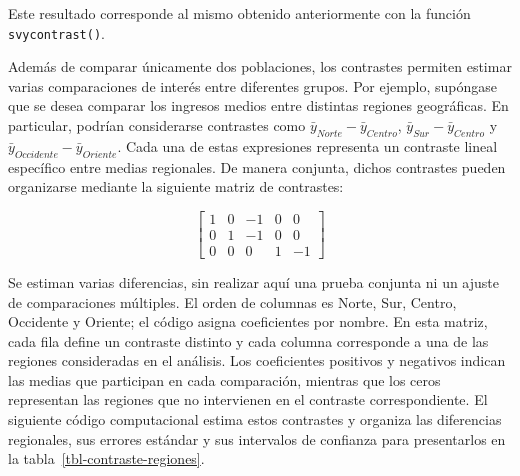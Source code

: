 \documentclass[
  spanish,
  11pt,
  letterpaper,
  oneside,
  open=any]{scrbook}
\begin{document}
Este resultado corresponde al mismo obtenido anteriormente con la
función \texttt{svycontrast()}.

Además de comparar únicamente dos poblaciones, los contrastes permiten
estimar varias comparaciones de interés entre diferentes grupos. Por
ejemplo, supóngase que se desea comparar los ingresos medios entre
distintas regiones geográficas. En particular, podrían considerarse
contrastes como \(\bar{y}_{Norte} - \bar{y}_{Centro}\),
\(\bar{y}_{Sur} - \bar{y}_{Centro}\) y
\(\bar{y}_{Occidente} - \bar{y}_{Oriente}\). Cada una de estas
expresiones representa un contraste lineal específico entre medias
regionales. De manera conjunta, dichos contrastes pueden organizarse
mediante la siguiente matriz de contrastes:

\[
\left[\begin{array}{ccccc}
1 & 0 & -1 & 0 & 0\\
0 & 1 & -1 & 0 & 0\\
0 & 0 & 0 & 1 & -1
\end{array}\right]
\]

Se estiman varias diferencias, sin realizar aquí una prueba conjunta ni
un ajuste de comparaciones múltiples. El orden de columnas es Norte,
Sur, Centro, Occidente y Oriente; el código asigna coeficientes por
nombre. En esta matriz, cada fila define un contraste distinto y cada
columna corresponde a una de las regiones consideradas en el análisis.
Los coeficientes positivos y negativos indican las medias que participan
en cada comparación, mientras que los ceros representan las regiones que
no intervienen en el contraste correspondiente. El siguiente código
computacional estima estos contrastes y organiza las diferencias
regionales, sus errores estándar y sus intervalos de confianza para
presentarlos en la tabla~\ref{tbl-contraste-regiones}.
\end{document}
